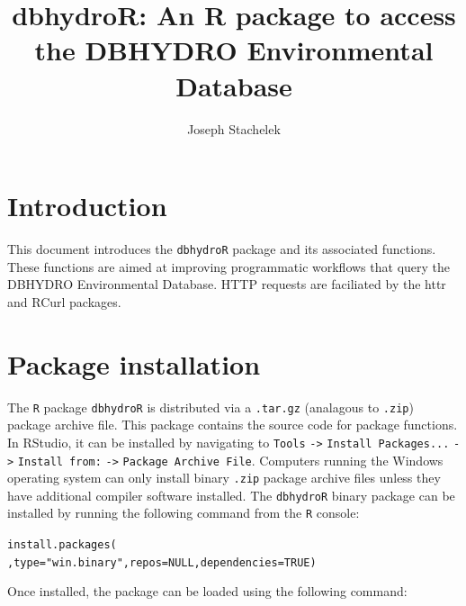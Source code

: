 \documentclass[12pt,notitlepage]{article}
\author{Joseph Stachelek}
\title{dbhydroR: An R package to access the DBHYDRO Environmental Database}
\begin{document}

\maketitle
 


\section{Introduction}

This document introduces the \texttt{dbhydroR} package and its associated functions. These functions are aimed at improving programmatic workflows that query the DBHYDRO Environmental Database. HTTP requests are faciliated by the httr \citep{httr} and RCurl \citep{rcurl} packages. 

\section{Package installation}

The \texttt{R} package \texttt{dbhydroR} is distributed via a \texttt{.tar.gz} (analagous to \texttt{.zip}) package archive file. This package contains the source code for package functions. In RStudio, it can be installed by navigating to \texttt{Tools} \verb|->| \texttt{Install Packages...} \verb|->| \texttt{Install from:} \verb|->| \texttt{Package Archive File}. Computers running the Windows operating system can only install binary \texttt{.zip} package archive files unless they have additional compiler software installed. The \texttt{dbhydroR} binary package can be installed by running the following command from the \texttt{R} console:

\vspace{10pt}
\noindent\texttt{install.packages(}\\
\texttt{,type="win.binary",repos=NULL,dependencies=TRUE)}
\vspace{8pt}

Once installed, the package can be loaded using the following command:
\end{document}

